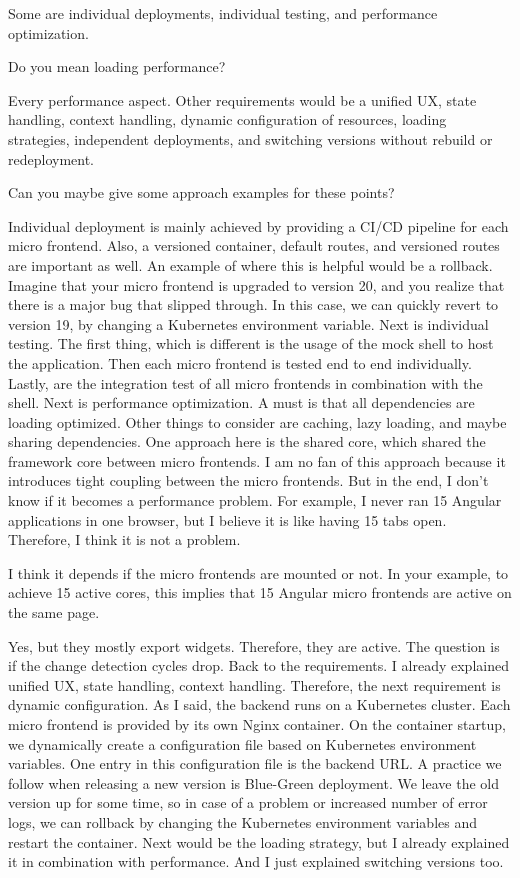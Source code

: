 \begin{description}
    \PirminRehm Some are individual deployments, individual testing, and performance optimization.

    \NicoVogel Do you mean loading performance?

    \PirminRehm Every performance aspect. Other requirements would be a unified UX, state handling, context handling, dynamic configuration of resources, loading strategies, independent deployments, and switching versions without rebuild or redeployment.

    \NicoVogel Can you maybe give some approach examples for these points?

    \PirminRehm Individual deployment is mainly achieved by providing a CI/CD pipeline for each micro frontend. Also, a versioned container, default routes, and versioned routes are important as well. An example of where this is helpful would be a rollback. Imagine that your micro frontend is upgraded to version 20, and you realize that there is a major bug that slipped through. In this case, we can quickly revert to version 19, by changing a Kubernetes environment variable.
    Next is individual testing. The first thing, which is different is the usage of the mock shell to host the application. Then each micro frontend is tested end to end individually. Lastly, are the integration test of all micro frontends in combination with the shell.
    Next is performance optimization. A must is that all dependencies are loading optimized. Other things to consider are caching, lazy loading, and maybe sharing dependencies. One approach here is the shared core, which shared the framework core between micro frontends. I am no fan of this approach because it introduces tight coupling between the micro frontends. But in the end, I don't know if it becomes a performance problem. For example, I never ran 15 Angular applications in one browser, but I believe it is like having 15 tabs open. Therefore, I think it is not a problem.

    \NicoVogel I think it depends if the micro frontends are mounted or not. In your example, to achieve 15 active cores, this implies that 15 Angular micro frontends are active on the same page.

    \PirminRehm Yes, but they mostly export widgets. Therefore, they are active. The question is if the change detection cycles drop.
    Back to the requirements. I already explained unified UX, state handling, context handling. Therefore, the next requirement is dynamic configuration.
    As I said, the backend runs on a Kubernetes cluster. Each micro frontend is provided by its own Nginx container. On the container startup, we dynamically create a configuration file based on Kubernetes environment variables. One entry in this configuration file is the backend URL. A practice we follow when releasing a new version is Blue-Green deployment. We leave the old version up for some time, so in case of a problem or increased number of error logs, we can rollback by changing the Kubernetes environment variables and restart the container.
    Next would be the loading strategy, but I already explained it in combination with performance. And I just explained switching versions too.


\end{description}
